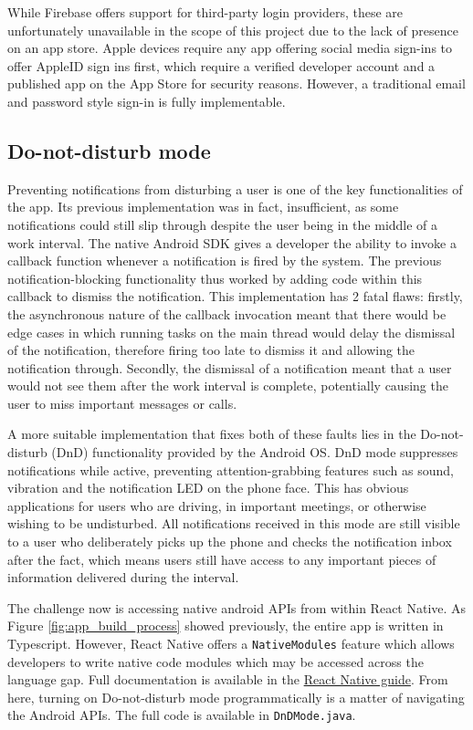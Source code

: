 While Firebase offers support for third-party login providers, these are unfortunately unavailable in the scope of this project due to the lack of presence on an app store. Apple devices require any app offering social media sign-ins to offer AppleID sign ins first, which require a verified developer account and a published app on the App Store for security reasons. However, a traditional email and password style sign-in is fully implementable.

\subsection{Do-not-disturb mode}
Preventing notifications from disturbing a user is one of the key functionalities of the app. Its previous implementation was in fact, insufficient, as some notifications could still slip through despite the user being in the middle of a work interval. The native Android SDK gives a developer the ability to invoke a callback function whenever a notification is fired by the system. The previous notification-blocking functionality thus worked by adding code within this callback to dismiss the notification. This implementation has 2 fatal flaws: firstly, the asynchronous nature of the callback invocation meant that there would be edge cases in which running tasks on the main thread would delay the dismissal of the notification, therefore firing too late to dismiss it and allowing the notification through. Secondly, the dismissal of a notification meant that a user would not see them after the work interval is complete, potentially causing the user to miss important messages or calls.

A more suitable implementation that fixes both of these faults lies in the Do-not-disturb (DnD) functionality provided by the Android OS. DnD mode suppresses notifications while active, preventing attention-grabbing features such as sound, vibration and the notification LED on the phone face. This has obvious applications for users who are driving, in important meetings, or otherwise wishing to be undisturbed. All notifications received in this mode are still visible to a user who deliberately picks up the phone and checks the notification inbox after the fact, which means users still have access to any important pieces of information delivered during the interval.

The challenge now is accessing native android APIs from within React Native. As Figure \ref{fig:app_build_process} showed previously, the entire app is written in Typescript. However, React Native offers a \texttt{NativeModules} feature which allows developers to write native code modules which may be accessed across the language gap. Full documentation is available in the \href{https://reactnative.dev/docs/native-modules-intro}{React Native guide}. From here, turning on Do-not-disturb mode programmatically is a matter of navigating the Android APIs. The full code is available in \texttt{DnDMode.java}.

